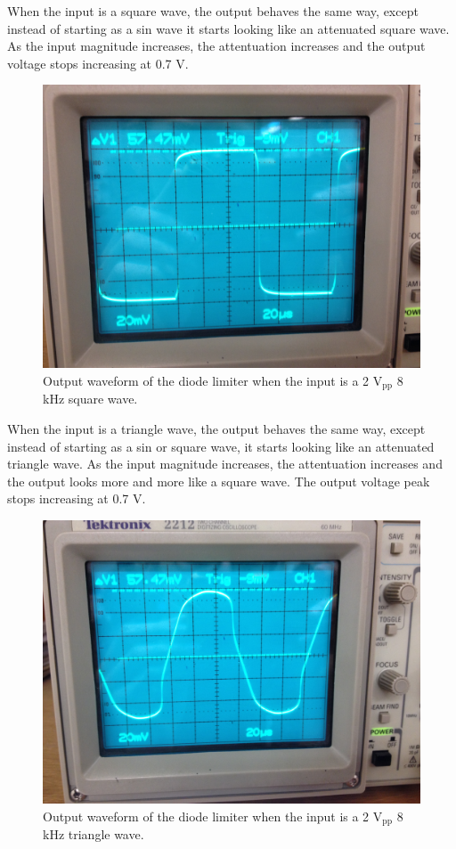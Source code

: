 \documentclass[12pt,letterpaper]{report}
\newlength \figwidth
\begin{document}
When the input is a square wave, the output behaves the same way, except instead of starting as a sin wave it starts looking like an attenuated square wave. As the input magnitude increases, the attentuation increases and the output voltage stops increasing at 0.7 V.

\begin{figure}[H]
\centering
\includegraphics[width=\figwidth, keepaspectratio=true]{lab4/3_7_2.jpg}
\caption{Output waveform of the diode limiter when the input is a 2 $\text{V}_{\text{pp}}$ 8 kHz square wave.}
\label{fig:3_7_2}
\end{figure}

When the input is a triangle wave, the output behaves the same way, except instead of starting as a sin or square wave, it starts looking like an attenuated triangle wave. As the input magnitude increases, the attentuation increases and the output looks more and more like a square wave. The output voltage peak stops increasing at 0.7 V.

\begin{figure}[H]
\centering
\includegraphics[width=\figwidth, keepaspectratio=true]{lab4/3_7_3.jpg}
\caption{Output waveform of the diode limiter when the input is a 2 $\text{V}_{\text{pp}}$ 8 kHz triangle wave.}
\label{fig:3_7_3}
\end{figure}
\end{document}
